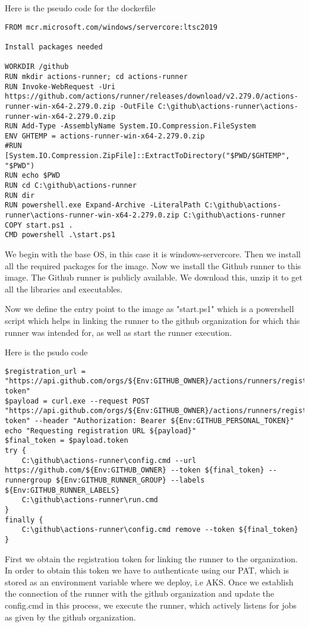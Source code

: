 Here is the pseudo code for the dockerfile

\begin{lstlisting}[breaklines]
FROM mcr.microsoft.com/windows/servercore:ltsc2019

Install packages needed

WORKDIR /github
RUN mkdir actions-runner; cd actions-runner
RUN Invoke-WebRequest -Uri https://github.com/actions/runner/releases/download/v2.279.0/actions-runner-win-x64-2.279.0.zip -OutFile C:\github\actions-runner\actions-runner-win-x64-2.279.0.zip
RUN Add-Type -AssemblyName System.IO.Compression.FileSystem 
ENV GHTEMP = actions-runner-win-x64-2.279.0.zip
#RUN [System.IO.Compression.ZipFile]::ExtractToDirectory("$PWD/$GHTEMP", "$PWD")
RUN echo $PWD
RUN cd C:\github\actions-runner
RUN dir
RUN powershell.exe Expand-Archive -LiteralPath C:\github\actions-runner\actions-runner-win-x64-2.279.0.zip C:\github\actions-runner
COPY start.ps1 .
CMD powershell .\start.ps1
\end{lstlisting}

We begin with the base OS, in this case it is windows-servercore. Then we install all the required packages for the image. Now we install the Github runner to this image. The Github runner is publicly available. We download this, unzip it to get all the libraries and executables.

Now we define the entry point to the image as "start.ps1" which is a powershell script which helps in linking the runner to the github organization for which this runner was intended for, as well as start the runner execution.

Here is the psudo code

\begin{lstlisting}[breaklines]
$registration_url = "https://api.github.com/orgs/${Env:GITHUB_OWNER}/actions/runners/registration-token"
$payload = curl.exe --request POST "https://api.github.com/orgs/${Env:GITHUB_OWNER}/actions/runners/registration-token" --header "Authorization: Bearer ${Env:GITHUB_PERSONAL_TOKEN}"
echo "Requesting registration URL ${payload}"
$final_token = $payload.token
try {
    C:\github\actions-runner\config.cmd --url https://github.com/${Env:GITHUB_OWNER} --token ${final_token} --runnergroup ${Env:GITHUB_RUNNER_GROUP} --labels ${Env:GITHUB_RUNNER_LABELS}
    C:\github\actions-runner\run.cmd
}
finally {
    C:\github\actions-runner\config.cmd remove --token ${final_token}
}
\end{lstlisting}

First we obtain the registration token for linking the runner to the organization. In order to obtain this token we have to authenticate using our PAT, which is stored as an environment variable where we deploy, i.e AKS. Once we establish the connection of the runner with the github organization and update the config.cmd in this process, we execute the runner, which actively listens for jobs as given by the github organization.

